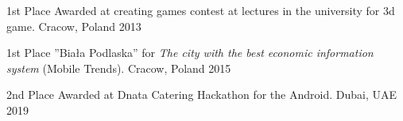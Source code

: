 




\begin{cvhonors}

  \cvhonor
    {1st Place} %
    {Awarded at creating games contest at lectures in the university for 3d game.} %
    {Cracow, Poland} %
    {2013} %

  \cvhonor
    {1st Place} %
    {''Biała Podlaska'' for \textit{The city with the best economic information system} (Mobile Trends).} %
    {Cracow, Poland} %
    {2015} %


\cvhonor
    {2nd Place} %
    {Awarded at Dnata Catering Hackathon for the Android. } %
    {Dubai, UAE} %
    {2019} %

\end{cvhonors}
